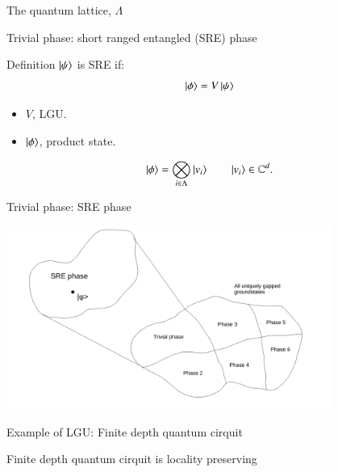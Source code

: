 \documentclass{beamer}
\begin{document}
\begin{frame}{The quantum lattice, $\Lambda$}
	\begin{center}
		
	\end{center}
\end{frame}

\begin{frame}{Trivial phase: short ranged entangled (SRE) phase}
	\begin{block}{Definition}
		$\ket{\psi}$ is SRE if:
		\[\ket{\phi}=V\ket{\psi}\]
		\begin{itemize}
			\item $V$, LGU.
			\item $\ket{\phi}$, product state.
		\end{itemize}
		\[\ket{\phi}=\bigotimes_{i\in\Lambda}\ket{v_i}\qquad \ket{v_i}\in\mathbb{C}^d.\]
	\end{block}
\end{frame}

\begin{frame}{Trivial phase: SRE phase}
	\begin{center}
		\includegraphics[trim={1.5cm 0 2cm 0},clip,width=0.8\textwidth]{Figures/SRE_Phase.pdf}
	\end{center}
\end{frame}

\begin{frame}{Example of LGU: Finite depth quantum cirquit}
	\begin{center}
		
	\end{center}
\end{frame}

\begin{frame}{Finite depth quantum cirquit is locality preserving}
	\begin{center}
		\scalebox{0.75}{}
	\end{center}
	\pause
	\begin{center}
		\scalebox{0.75}{}
	\end{center}
\end{frame}
\end{document}

